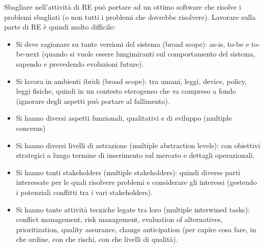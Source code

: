 Sbagliare nell’attività di RE può portare ad un ottimo software che risolve i problemi sbagliati (o non tutti i problemi che dovrebbe risolvere). Lavorare sulla parte di RE è quindi molto difficile:
\begin{itemize}
    \item Si deve ragionare su tante versioni del sistema (broad scope): as-is, to-be e to-be-next (quando si vuole essere lungimiranti sul comportamento del sistema, sapendo e prevedendo evoluzioni future).
    \item Si lavora in ambienti ibridi (broad scope): tra umani, leggi, device, policy, leggi fisiche, quindi in un contesto eterogeneo che va compreso a fondo (ignorare degli aspetti può portare al fallimento).
    \item Si hanno diversi aspetti funzionali, qualitativi e di sviluppo (multiple concerns)
    \item Si hanno diversi livelli di astrazione (multiple abstraction levels): con obiettivi strategici a lungo termine di inserimento sul mercato e dettagli operazionali.
    \item Si hanno tanti stakeholders (multiple stakeholders): quindi diverse parti interessate per le quali risolvere problemi e considerare gli interessi (gestendo i potenziali conflitti tra i vari stakeholders).
    \item Si hanno tante attività tecniche legate tra loro (multiple interwined tasks): conflict management, risk management, evaluation of alternatives, prioritization, quality assurance, change anticipation (per capire cosa fare, in che ordine, con che rischi, con che livelli di qualità).
\end{itemize}


